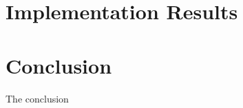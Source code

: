 \documentclass{amsart}
\theoremstyle{remark}
\begin{document}

\section{Implementation Results}
\label{sec:Implementation}

\vspace{0.3in}


\section{Conclusion}
\label{sec:Conclusion}
The conclusion




\nocite{*}


\end{document}
